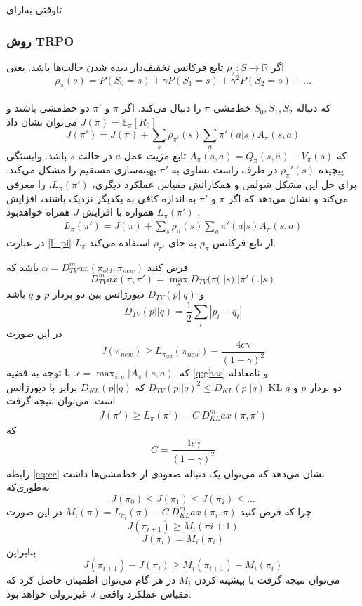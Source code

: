 
‌تاوقتی
‌به‌ازای
\subsubsection{روش TRPO}
اگر
$\rho_\pi : S \longrightarrow \mathbb{R}$
تابع فرکانس تخفیف‌دار دیده شدن حالت‌ها باشد. یعنی $$\rho_\pi(s) = P(S_0=s) + \gamma P(S_1=s) + \gamma^2 P(S_2=s) + ...$$ \\که دنباله $S_0, S_1, S_2$ خط‌مشی $\pi$ را دنبال می‌کند.
اگر $\pi$ و $\pi'$ دو خط‌مشی باشند و  $J(\pi) = \mathbb{E}_\pi[R_0]$  می‌توان نشان داد 
$$J(\pi')= J(\pi) + \sum_{s} \rho_{\pi'}(s) \sum_{a} \pi'(a|s) A_\pi(s,a)$$ که  $A_\pi(s,a) = Q_\pi (s,a) - V_\pi(s)$ تابع مزیت عمل $a$ در حالت $s$ باشد.
وابستگی پیچیده  $\rho_\pi'(s)$ در طرف راست تساوی به $\pi'$ بهینه‌سازی مستقیم را مشکل می‌کند.
برای حل این مشکل شولمن و همکارانش 
مقیاس عملکرد دیگری، $L_\pi(\pi')$، را معرفی می‌کند و نشان می‌دهد که اگر $\pi$ و $\pi'$ به اندازه کافی به یکدیگر نزدیک باشند، افزایش  $L_\pi(\pi')$  همواره با افزایش $J$ همراه خواهد‌بود \cite{schulman2015trust}.
\begin{align}
L_\pi(\pi')= J(\pi) + \sum_{s} \rho_{\pi}(s) \sum_{a} \pi'(a|s) A_\pi(s,a)
\label{l_pi}
\end{align}
در عبارت 
\ref{l_pi}
 $L_\pi$ از تابع فرکانس $\rho_\pi$ به جای $
\rho_{\pi'}$
 استفاده می‌کند.
 
فرض کنید 
$\alpha = D_{TV}^max(\pi_{old}, \pi_{new})$
باشد که 
$$D_{TV}^max (\pi, \pi') = \max_{s} D_{TV}(\pi(.|s) || \pi'(.|s)$$
و 
$D_{TV}(p || q)$
دیورژانس 
 بین دو بردار $p$ و $q$ باشد
$$D_{TV}(p || q) = \dfrac{1}{2} \sum_{i} |p_i - q_i|$$ در این صورت
$$J(\pi_{new}) \ge L_{\pi_{old}}(\pi_{new}) - \dfrac{4 \epsilon \gamma}{(1- \gamma)^2}$$ که $\epsilon = \max_{s,a} |A_\pi(s,a)|$.
\label{q:ghas}
با توجه به قضیه \ref{q:ghas} و نامعادله $D_{TV}(p || q)^2 \le D_{KL}(p || q)$  که  $D_{KL} (p || q)$ برابر با دیورژانس KL دو بردار $p$ و $q$ است\cite{schulman2015trust}. می‌توان  نتیجه گرفت
\begin{align*}
J(\pi') \ge L_{\pi}(\pi') - C \ D_{KL}^max(\pi, \pi')
\end{align*}
که
\begin{align}
C = \dfrac{4 \epsilon \gamma}{(1-\gamma)^2}
\label{eq:cc}
\end{align}
رابطه \ref{eq:cc} نشان می‌دهد که می‌توان یک دنباله صعودی از خط‌مشی‌ها داشت به‌طوری‌که
$$J(\pi_0) \le J(\pi_1) \le J(\pi_2) \le ... $$
چرا که فرض کنید
$M_i(\pi) = L_{\pi_i}(\pi) - C \ D_{KL}^max(\pi_i, \pi)$
در این صورت $$J(\pi_{i+1}) \ge M_i(\pi{i+1}) $$ 
$$J(\pi_i) = M_i(\pi_i)$$
بنابراین
$$J(\pi_{i+1}) - J(\pi_i) \ge M_i(\pi_{i+1}) - M_i(\pi_i)$$
می‌توان نتیجه گرفت با بیشینه کردن $M_i$ در هر گام می‌توان اطمینان حاصل کرد که مقیاس عملکرد واقعی $J$ غیرنزولی خواهد بود.

